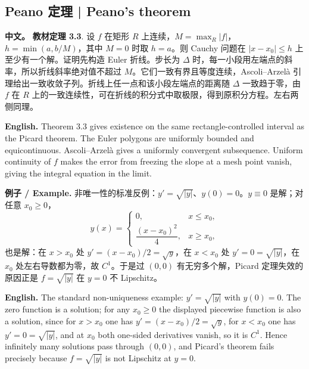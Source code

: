 \documentclass[UTF8,11pt,a4paper]{ctexart}
\newcommand{\APS}[2]{\par\noindent\textbf{中文。} #1\par\noindent\textbf{English.} #2\par}
\newcommand{\EN}[1]{\par\noindent \textbf{English.} #1\par}
\newcommand{\EX}[2]{\par\noindent \textbf{例子 / Example.} #1\par\EN{#2}}
\begin{document}
\subsection{Peano 定理 | Peano's theorem}
\APS{\textbf{教材定理 3.3}. 设 $f$ 在矩形 $R$ 上连续，$M=\max_R|f|$，$h=\min(a,b/M)$，其中 $M=0$ 时取 $h=a$。则 Cauchy 问题在 $|x-x_0|\le h$ 上至少有一个解。证明先构造 Euler 折线。步长为 $\Delta$ 时，每一小段用左端点的斜率，所以折线斜率绝对值不超过 $M$。它们一致有界且等度连续，Ascoli--Arzel\`a 引理给出一致收敛子列。折线上任一点和该小段左端点的距离随 $\Delta$ 一致趋于零，由 $f$ 在 $R$ 上的一致连续性，可在折线的积分式中取极限，得到原积分方程。左右两侧同理。}{Theorem 3.3 gives existence on the same rectangle-controlled interval as the Picard theorem. The Euler polygons are uniformly bounded and equicontinuous. Ascoli--Arzel\`a gives a uniformly convergent subsequence. Uniform continuity of $f$ makes the error from freezing the slope at a mesh point vanish, giving the integral equation in the limit.}
\EX{非唯一性的标准反例：$y'=\sqrt{|y|}$、$y(0)=0$。$y\equiv0$ 是解；对任意 $x_0\ge0$，
\[
y(x)=\begin{cases}0, & x\le x_0,\\[2pt] \dfrac{(x-x_0)^2}{4}, & x\ge x_0,\end{cases}
\]
也是解：在 $x>x_0$ 处 $y'=(x-x_0)/2=\sqrt y$，在 $x<x_0$ 处 $y'=0=\sqrt{|y|}$，在 $x_0$ 处左右导数都为零，故 $C^1$。于是过 $(0,0)$ 有无穷多个解，Picard 定理失效的原因正是 $f=\sqrt{|y|}$ 在 $y=0$ 不 Lipschitz。}{The standard non-uniqueness example: $y'=\sqrt{|y|}$ with $y(0)=0$. The zero function is a solution; for any $x_0\ge0$ the displayed piecewise function is also a solution, since for $x>x_0$ one has $y'=(x-x_0)/2=\sqrt y$, for $x<x_0$ one has $y'=0=\sqrt{|y|}$, and at $x_0$ both one-sided derivatives vanish, so it is $C^1$. Hence infinitely many solutions pass through $(0,0)$, and Picard's theorem fails precisely because $f=\sqrt{|y|}$ is not Lipschitz at $y=0$.}
\end{document}
